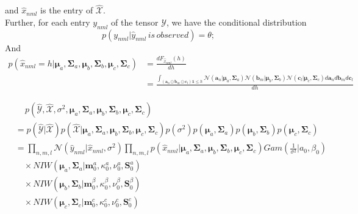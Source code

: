 \documentclass{article}
\newcommand{\bs}[1]{\boldsymbol{#1}}
\newcommand{\gs}[3]{\mathcal{N}(#1|#2,#3)}
\begin{document}
\begin{flushleft}
\begin{equation}
\end{equation}
and $\hat{x}_{nml}$ is the entry of $\mathcal{\hat{X}}$.\\
Further, for each entry $y_{nml}$ of the tensor $\mathcal{Y}$, we have the conditional distribution
\begin{equation}
	p(y_{nml}|\hat{y}_{nml} \, is \, observed) = \theta;
\end{equation}
And 
\begin{equation}
	\begin{split}
		p(\hat{x}_{nml}=h|\bs{\mu}_a, \bs{\Sigma}_a, \bs{\mu}_b, \bs{\Sigma}_b, \bs{\mu}_c, \bs{\Sigma}_c) &= \frac{d F_{\hat{x}_{nml}}(h)}{dh}\\
                   &=	\frac{\int_{(\bs{a}_n \odot \bs{b}_m \odot \bs{c}_l)\bs{1} \leq h} \gs{\bs{a}_n}{\bs{\mu}_a}{\bs{\Sigma}_a} \gs{\bs{b}_m}{\bs{\mu}_b}{\bs{\Sigma}_b} \gs{\bs{c}_l}{\bs{\mu}_c}{\bs{\Sigma}_c} d\bs{a}_n d\bs{b}_m d\bs{c}_l}{dh}				   
	\end{split}
\end{equation}
 
\begin{equation}
	\begin{split}
		& \quad \, p(\mathcal{\hat{Y}}, \mathcal{\hat{X}}, \sigma^2, \bs{\mu}_a, \bs{\Sigma}_a, \bs{\mu}_b, \bs{\Sigma}_b, \bs{\mu}_c, \bs{\Sigma}_c)\\
		& = p(\mathcal{\hat{Y}} | \mathcal{\hat{X}})p(\mathcal{\hat{X}}| \bs{\mu}_a, \bs{\Sigma}_a, \bs{\mu}_b, \bs{\Sigma}_b, \bs{\mu}_c, \bs{\Sigma}_c)p(\sigma^2)p(\bs{\mu}_a, \bs{\Sigma}_a)p(\bs{\mu}_b, \bs{\Sigma}_b)p(\bs{\mu}_c, \bs{\Sigma}_c)\\
		& = \prod_{n,m,l}\gs{\hat{y}_{nml}}{\hat{x}_{nml}}{\sigma^2}
		    \prod_{n,m,l}p(\hat{x}_{nml}|\bs{\mu}_a, \bs{\Sigma}_a, \bs{\mu}_b, \bs{\Sigma}_b, \bs{\mu}_c, \bs{\Sigma}_c)
		    Gam(\frac{1}{\sigma^2}|a_0, \beta_0)\\
		    &\quad 
			\times NIW(\bs{\mu}_a, \bs{\Sigma}_a|\bs{m}^a_0,\kappa^a_0,\nu^a_0,\bs{S}^a_0)\\
			&\quad  \times NIW(\bs{\mu}_b, \bs{\Sigma}_b|\bs{m}^\beta_0,\kappa^\beta_0,\nu^\beta_0,\bs{S}^\beta_0)\\
			&\quad  \times NIW(\bs{\mu}_c, \bs{\Sigma}_c|\bs{m}^c_0,\kappa^c_0,\nu^c_0,\bs{S}^c_0)	    
	\end{split}
\end{equation}


\newpage


\end{flushleft}
\end{document}
